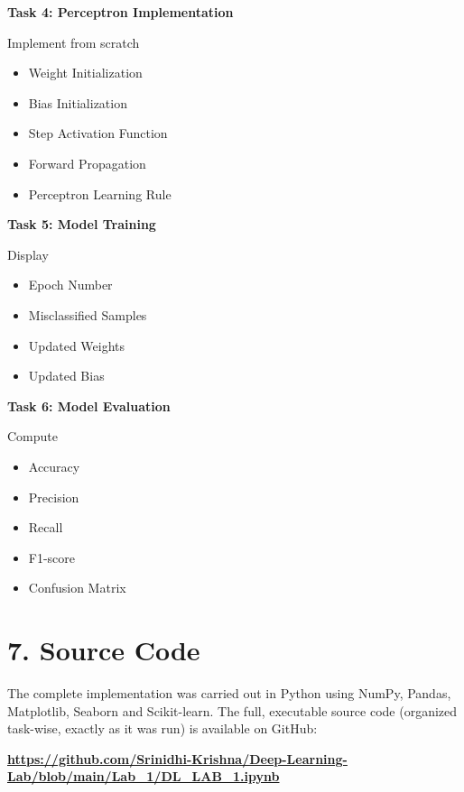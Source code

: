 \documentclass[11pt]{article}
\begin{document}
\vspace{2mm}

\textbf{Task 4: Perceptron Implementation}

Implement from scratch

\begin{itemize}
\item Weight Initialization
\item Bias Initialization
\item Step Activation Function
\item Forward Propagation
\item Perceptron Learning Rule
\end{itemize}

\vspace{2mm}

\textbf{Task 5: Model Training}

Display

\begin{itemize}
\item Epoch Number
\item Misclassified Samples
\item Updated Weights
\item Updated Bias
\end{itemize}

\vspace{2mm}

\textbf{Task 6: Model Evaluation}

Compute

\begin{itemize}
\item Accuracy
\item Precision
\item Recall
\item F1-score
\item Confusion Matrix
\end{itemize}



\section*{7. Source Code}

The complete implementation was carried out in Python using NumPy, Pandas, Matplotlib, Seaborn and Scikit-learn. The full, executable source code (organized task-wise, exactly as it was run) is available on GitHub:

\begin{center}
\href{https://github.com/Srinidhi-Krishna/Deep-Learning-Lab/blob/main/Lab_1/DL_LAB_1.ipynb}{\textbf{https://github.com/Srinidhi-Krishna/Deep-Learning-Lab/blob/main/Lab\_1/DL\_LAB\_1.ipynb}}
\end{center}
\end{document}
